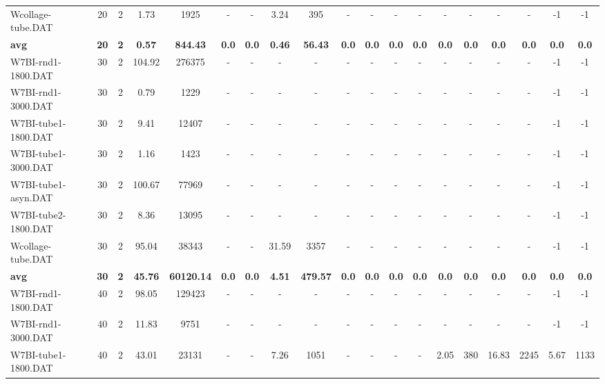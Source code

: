 \begin{sidewaystable}[!ht]
{\begin{tabular}{lcccccccccccccccccc}
Wcollage-tube.DAT & 20 & 2 &  \textcolor{blue2}{1.73} & 1925 &  - &  - & 3.24 & 395 &  - &  - &  - &  - &  - &  - &  - &  - & -1 & -1 \\
\cline{1-19} \textbf{avg} & \textbf{20} & \textbf{2} & \textbf{0.57} & \textbf{844.43} & \textbf{0.0} & \textbf{0.0} & \textbf{0.46} & \textbf{56.43} & \textbf{0.0} & \textbf{0.0} & \textbf{0.0} & \textbf{0.0} & \textbf{0.0} & \textbf{0.0} & \textbf{0.0} & \textbf{0.0} & \textbf{0.0} & \textbf{0.0} \\ \cline{1-19}
W7BI-rnd1-1800.DAT & 30 & 2 &  \textcolor{blue2}{104.92} & 276375 &  - &  - &  - &  - &  - &  - &  - &  - &  - &  - &  - &  - & -1 & -1 \\
W7BI-rnd1-3000.DAT & 30 & 2 &  \textcolor{blue2}{0.79} & 1229 &  - &  - &  - &  - &  - &  - &  - &  - &  - &  - &  - &  - & -1 & -1 \\
W7BI-tube1-1800.DAT & 30 & 2 &  \textcolor{blue2}{9.41} & 12407 &  - &  - &  - &  - &  - &  - &  - &  - &  - &  - &  - &  - & -1 & -1 \\
W7BI-tube1-3000.DAT & 30 & 2 &  \textcolor{blue2}{1.16} & 1423 &  - &  - &  - &  - &  - &  - &  - &  - &  - &  - &  - &  - & -1 & -1 \\
W7BI-tube1-asyn.DAT & 30 & 2 &  \textcolor{blue2}{100.67} & 77969 &  - &  - &  - &  - &  - &  - &  - &  - &  - &  - &  - &  - & -1 & -1 \\
W7BI-tube2-1800.DAT & 30 & 2 &  \textcolor{blue2}{8.36} & 13095 &  - &  - &  - &  - &  - &  - &  - &  - &  - &  - &  - &  - & -1 & -1 \\
Wcollage-tube.DAT & 30 & 2 & 95.04 & 38343 &  - &  - &  \textcolor{blue2}{31.59} & 3357 &  - &  - &  - &  - &  - &  - &  - &  - & -1 & -1 \\
\cline{1-19} \textbf{avg} & \textbf{30} & \textbf{2} & \textbf{45.76} & \textbf{60120.14} & \textbf{0.0} & \textbf{0.0} & \textbf{4.51} & \textbf{479.57} & \textbf{0.0} & \textbf{0.0} & \textbf{0.0} & \textbf{0.0} & \textbf{0.0} & \textbf{0.0} & \textbf{0.0} & \textbf{0.0} & \textbf{0.0} & \textbf{0.0} \\ \cline{1-19}
W7BI-rnd1-1800.DAT & 40 & 2 &  \textcolor{blue2}{98.05} & 129423 &  - &  - &  - &  - &  - &  - &  - &  - &  - &  - &  - &  - & -1 & -1 \\
W7BI-rnd1-3000.DAT & 40 & 2 &  \textcolor{blue2}{11.83} & 9751 &  - &  - &  - &  - &  - &  - &  - &  - &  - &  - &  - &  - & -1 & -1 \\
W7BI-tube1-1800.DAT & 40 & 2 & 43.01 & 23131 &  - &  - & 7.26 & 1051 &  - &  - &  - &  - &  \textcolor{blue2}{2.05} & 380 & 16.83 & 2245 & 5.67 & 1133 \\

\end{tabular}}
\end{sidewaystable}
